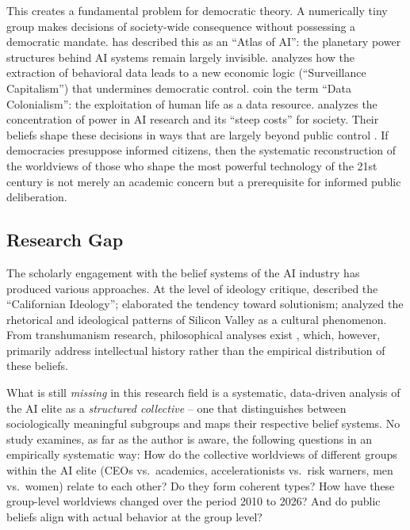 \documentclass[12pt,a4paper]{article}
\begin{document}
This creates a fundamental problem for democratic theory. A numerically tiny group makes decisions of society-wide consequence without possessing a democratic mandate. \citet{Crawford2021} has described this as an ``Atlas of AI'': the planetary power structures behind AI systems remain largely invisible. \citet{Zuboff2019} analyzes how the extraction of behavioral data leads to a new economic logic (``Surveillance Capitalism'') that undermines democratic control. \citet{Couldry2019} coin the term ``Data Colonialism'': the exploitation of human life as a data resource. \citet{Whittaker2021} analyzes the concentration of power in AI research and its ``steep costs'' for society. Their beliefs shape these decisions in ways that are largely beyond public control \citep{Floridi2019, Floridi2023}. If democracies presuppose informed citizens, then the systematic reconstruction of the worldviews of those who shape the most powerful technology of the 21st century is not merely an academic concern but a prerequisite for informed public deliberation.


\subsection{Research Gap}
\label{sec:einleitung:luecke}

The scholarly engagement with the belief systems of the AI industry has produced various approaches. At the level of ideology critique, \citet{BarbCam1996} described the ``Californian Ideology''; \citet{Morozov2013} elaborated the tendency toward solutionism; \citet{Daub2020} analyzed the rhetorical and ideological patterns of Silicon Valley as a cultural phenomenon. From transhumanism research, philosophical analyses exist \citep{Bostrom2005, MoreVitaMore2013, Coeckelbergh2020}, which, however, primarily address intellectual history rather than the empirical distribution of these beliefs.

What is still \emph{missing} in this research field is a systematic, data-driven analysis of the AI elite as a \emph{structured collective} -- one that distinguishes between sociologically meaningful subgroups and maps their respective belief systems. No study examines, as far as the author is aware, the following questions in an empirically systematic way: How do the collective worldviews of different groups within the AI elite (CEOs vs.\ academics, accelerationists vs.\ risk warners, men vs.\ women) relate to each other? Do they form coherent types? How have these group-level worldviews changed over the period 2010 to 2026? And do public beliefs align with actual behavior at the group level?
\end{document}
